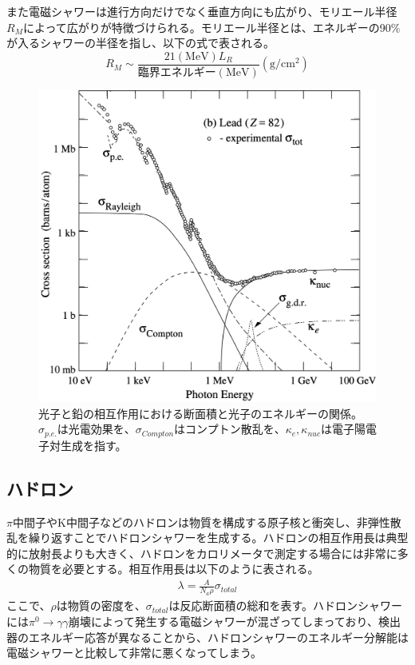 また電磁シャワーは進行方向だけでなく垂直方向にも広がり、モリエール半径$R_M$によって広がりが特徴づけられる。モリエール半径とは、エネルギーの90$\%$が入るシャワーの半径を指し、以下の式で表される。
\begin{equation}
 \label{moliere}
 R_M \sim \frac{21 (\mathrm{MeV}) L_R}{臨界エネルギー (\mathrm{MeV})}  (\mathrm{g}/\mathrm{{cm}^2})
\end{equation}
\begin{figure}[h]
	\begin{center}
 \includegraphics[keepaspectratio, scale=0.4]
 	{Figure/Siwecal/photon_crosssection.png}
 		\caption{光子と鉛の相互作用における断面積と光子のエネルギーの関係。${\sigma}_{p.e.}$は光電効果を、${\sigma}_{Compton}$はコンプトン散乱を、${\kappa}_{e}, {\kappa}_{nuc}$は電子陽電子対生成を指す。}
 		\label{photon_cs}
	\end{center}
 \end{figure}
\subsection{ハドロン}
$\pi$中間子やK中間子などのハドロンは物質を構成する原子核と衝突し、非弾性散乱を繰り返すことでハドロンシャワーを生成する。ハドロンの相互作用長は典型的に放射長よりも大きく、ハドロンをカロリメータで測定する場合には非常に多くの物質を必要とする。相互作用長は以下のように表される。
\begin{align}
\lambda = \frac{A}{N_a \rho} \sigma_{total}
\end{align}
ここで、$\rho$は物質の密度を、$ \sigma_{total}$は反応断面積の総和を表す。ハドロンシャワーには${\pi}^0 \rightarrow \gamma \gamma$崩壊によって発生する電磁シャワーが混ざってしまっており、検出器のエネルギー応答が異なることから、ハドロンシャワーのエネルギー分解能は電磁シャワーと比較して非常に悪くなってしまう。

